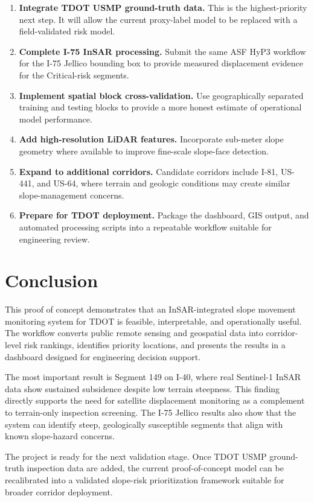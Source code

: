 \documentclass[11pt,letterpaper]{article}
\begin{document}
\begin{enumerate}
  \item \textbf{Integrate TDOT USMP ground-truth data.} This is the highest-priority next step. It will allow the current proxy-label model to be replaced with a field-validated risk model.
  \item \textbf{Complete I-75 InSAR processing.} Submit the same ASF HyP3 workflow for the I-75 Jellico bounding box to provide measured displacement evidence for the Critical-risk segments.
  \item \textbf{Implement spatial block cross-validation.} Use geographically separated training and testing blocks to provide a more honest estimate of operational model performance.
  \item \textbf{Add high-resolution LiDAR features.} Incorporate sub-meter slope geometry where available to improve fine-scale slope-face detection.
  \item \textbf{Expand to additional corridors.} Candidate corridors include I-81, US-441, and US-64, where terrain and geologic conditions may create similar slope-management concerns.
  \item \textbf{Prepare for TDOT deployment.} Package the dashboard, GIS output, and automated processing scripts into a repeatable workflow suitable for engineering review.
\end{enumerate}

\section{Conclusion}
\label{sec:conclusion}

This proof of concept demonstrates that an InSAR-integrated slope movement monitoring system for TDOT is feasible, interpretable, and operationally useful. The workflow converts public remote sensing and geospatial data into corridor-level risk rankings, identifies priority locations, and presents the results in a dashboard designed for engineering decision support.

The most important result is Segment 149 on I-40, where real Sentinel-1 InSAR data show sustained subsidence despite low terrain steepness. This finding directly supports the need for satellite displacement monitoring as a complement to terrain-only inspection screening. The I-75 Jellico results also show that the system can identify steep, geologically susceptible segments that align with known slope-hazard concerns.

The project is ready for the next validation stage. Once TDOT USMP ground-truth inspection data are added, the current proof-of-concept model can be recalibrated into a validated slope-risk prioritization framework suitable for broader corridor deployment.
\end{document}
